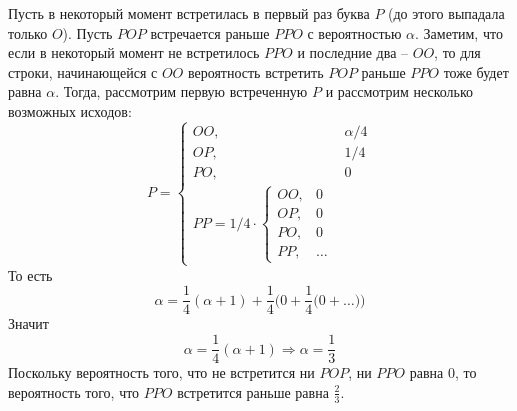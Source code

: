 \begin{solution}
    Пусть в некоторый момент встретилась в первый раз буква $P$ (до этого выпадала только $O$). Пусть $POP$ встречается раньше $PPO$ с вероятностью $\alpha$. Заметим, что если в некоторый момент не встретилось $PPO$ и последние два -- $OO$, то для строки, начинающейся с $OO$ вероятность встретить $POP$ раньше $PPO$ тоже будет равна $\alpha$. Тогда, рассмотрим первую встреченную $P$ и рассмотрим несколько возможных исходов:
    \begin{equation*}
        P = \begin{cases}
                OO, & \alpha/4 \\
                OP, & 1/4 \\
                PO,  & 0 \\
                PP = 1/4\cdot\begin{cases}
                                 OO, & 0 \\
                                 OP, & 0 \\
                                 PO, & 0 \\
                                 PP, & \ldots
                \end{cases}
        \end{cases}
    \end{equation*}
    То есть \[
                \alpha = \dfrac{1}{4}(\alpha + 1) + \dfrac{1}{4}\bigg(0 + \dfrac{1}{4}\bigg(0 + \ldots\bigg)\bigg)
    \]
    Значит \[
               \alpha = \dfrac{1}{4}(\alpha + 1) \Rightarrow \alpha = \dfrac{1}{3}
    \]
    Поскольку вероятность того, что не встретится ни $POP$, ни $PPO$ равна 0, то вероятность того, что $PPO$ встретится раньше равна $\frac{2}{3}$.
\end{solution}